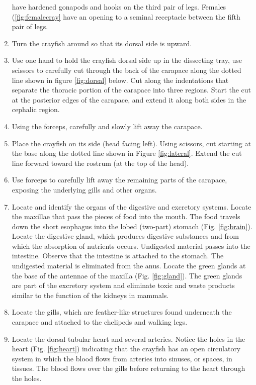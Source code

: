 \begin{enumerate}
  have hardened gonapods and hooks on the third pair of legs. Females
  (\ref{fig:femalecray} have an opening to a seminal receptacle between
  the fifth pair of legs.
\item
  Turn the crayfish around so that its dorsal side is upward.
\item
  Use one hand to hold the crayfish dorsal side up in the dissecting
  tray, use scissors to carefully cut through the back of the carapace
  along the dotted line shown in figure \ref{fig:dorsal} below. Cut
  along the indentations that separate the thoracic portion of the
  carapace into three regions. Start the cut at the posterior edges of
  the carapace, and extend it along both sides in the cephalic region.
\item
  Using the forceps, carefully and slowly lift away the carapace.
\item
  Place the crayfish on its side (head facing left). Using scissors, cut
  starting at the base along the dotted line shown in Figure
  \ref{fig:lateral}. Extend the cut line forward toward the rostrum (at
  the top of the head).
\item
  Use forceps to carefully lift away the remaining parts of the
  carapace, exposing the underlying gills and other organs.
\item
  Locate and identify the organs of the digestive and excretory systems. Locate the maxillae that pass the pieces of food into the mouth. The food travels down the short esophagus into the lobed (two-part) stomach (Fig. \ref{fig:brain}). Locate the digestive gland, which produces digestive substances and from which the absorption of nutrients occurs. Undigested material passes into the intestine. Observe that the intestine is attached to the stomach. The undigested material is eliminated from the anus. Locate the green glands at the base of the antennae of the maxilla (Fig. \ref{fig:gland}). The green glands are part of the excretory system and eliminate toxic and waste products similar to the function of the kidneys in mammals.
\item
  Locate the gills, which are feather-like structures found underneath the carapace and attached to the chelipeds and walking legs.
\item
  Locate the dorsal tubular heart and several arteries. Notice the holes in the heart (Fig. \ref{fig:heart}) indicating that the crayfish has an open circulatory system in which the blood flows from arteries into sinuses, or spaces, in tissues. The blood flows over the gills before returning to the heart through the holes.

\end{enumerate}
